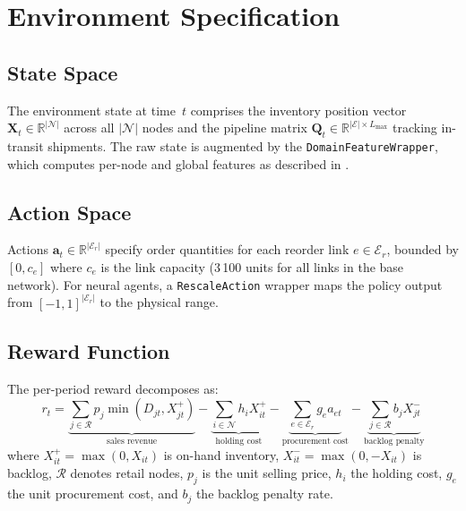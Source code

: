
\appendix

\section{Environment Specification}\label{app:env}

\subsection{State Space}

The environment state at time~$t$ comprises the inventory
position vector $\mathbf{X}_t \in \mathbb{R}^{|\mathcal{N}|}$ across all
$|\mathcal{N}|$ nodes and the pipeline matrix
$\mathbf{Q}_t \in \mathbb{R}^{|\mathcal{E}| \times L_{\max}}$ tracking
in-transit shipments. The raw state is augmented by the
\texttt{DomainFeatureWrapper}, which computes per-node and global features
as described in .

\subsection{Action Space}

Actions $\mathbf{a}_t \in \mathbb{R}^{|\mathcal{E}_r|}$ specify order
quantities for each reorder link $e \in \mathcal{E}_r$, bounded by
$[0, c_e]$ where $c_e$ is the link capacity (3\,100 units for all links in
the base network). For neural agents, a \texttt{RescaleAction} wrapper maps
the policy output from $[-1, 1]^{|\mathcal{E}_r|}$ to the physical range.

\subsection{Reward Function}

The per-period reward decomposes as:
\[
r_t = \underbrace{\sum_{j \in \mathcal{R}} p_j \min(D_{jt}, X_{jt}^+)}_{\text{sales revenue}}
      - \underbrace{\sum_{i \in \mathcal{N}} h_i X_{it}^+}_{\text{holding cost}}
      - \underbrace{\sum_{e \in \mathcal{E}_r} g_e a_{et}}_{\text{procurement cost}}
      - \underbrace{\sum_{j \in \mathcal{R}} b_j X_{jt}^-}_{\text{backlog penalty}}
\]
where $X_{it}^+ = \max(0, X_{it})$ is on-hand inventory,
$X_{it}^- = \max(0, -X_{it})$ is backlog, $\mathcal{R}$ denotes retail
nodes, $p_j$ is the unit selling price, $h_i$ the holding cost,
$g_e$ the unit procurement cost, and $b_j$ the backlog penalty rate.

